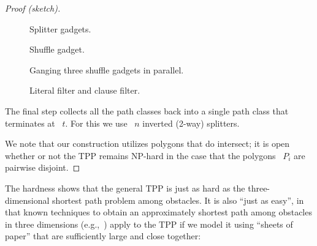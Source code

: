 \documentclass[11pt]{article}
\begin{document}
\begin{proof}[Proof (sketch)]
\begin{figure}[H]
	\centering
	\caption{Splitter gadgets.}
	\label{fig:splitters}
\end{figure}

\begin{figure}[H]
	\centering
	\caption{Shuffle gadget.}
	\label{fig:shuffle}
\end{figure}

\begin{figure}[H]
	\centering
	\caption{Ganging three shuffle gadgets in parallel.}
	\label{fig:ganging}
\end{figure}

\begin{figure}[H]
	\centering
	\caption{Literal filter and clause filter.}
	\label{fig:literalclause}
\end{figure}

The final step collects all the path classes back into a single path class that terminates at ~\(t\).
For this we use ~\(n\) inverted (2-way) splitters.

We note that our construction utilizes polygons that do intersect; it is open whether or not the TPP remains NP-hard in the case that the polygons ~\(P_i\) are pairwise disjoint.
\end{proof}

The hardness shows that the general TPP is just as hard as the three-dimensional shortest path problem among obstacles.
It is also ``just as easy'', in that known techniques to obtain an approximately shortest path among obstacles in three dimensions (e.g.,~\cite{ref1, ref10, ref11, ref12, ref22}) apply to the TPP if we model it using ``sheets of paper'' that are sufficiently large and close together:
\end{document}
